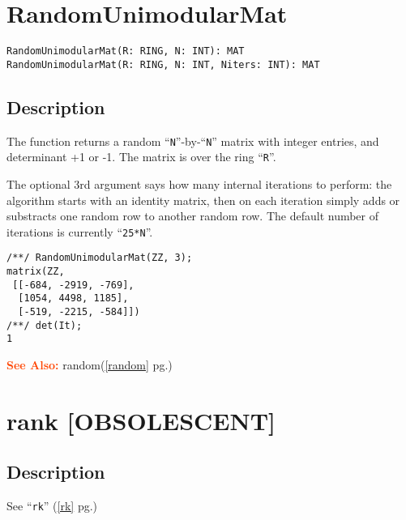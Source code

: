 \documentclass[a4paper]{mybook}
\newenvironment{command}{}{} %
\newcommand\SeeAlso{\par\textcolor{OrangeRed}{\textbf{\large See Also: }}}
\begin{document}
\section{RandomUnimodularMat}
\label{RandomUnimodularMat}
\begin{command} %


\begin{Verbatim}[label=syntax, rulecolor=\color{MidnightBlue},
frame=single]
RandomUnimodularMat(R: RING, N: INT): MAT
RandomUnimodularMat(R: RING, N: INT, Niters: INT): MAT
\end{Verbatim}


\subsection*{Description}

The function returns a random ``\verb&N&''-by-``\verb&N&'' matrix with integer
entries, and determinant +1 or -1.  The matrix is over the ring ``\verb&R&''.
\par 
The optional 3rd argument says how many internal iterations to
perform: the algorithm starts with an identity matrix, then on each
iteration simply adds or substracts one random row to another random
row.  The default number of iterations is currently ``\verb&25*N&''.
\begin{Verbatim}[label=example, rulecolor=\color{PineGreen}, frame=single]
/**/ RandomUnimodularMat(ZZ, 3);
matrix(ZZ,
 [[-684, -2919, -769],
  [1054, 4498, 1185],
  [-519, -2215, -584]])
/**/ det(It);
1
\end{Verbatim}


\SeeAlso %
  random(\ref{random} pg.\pageref{random})
\end{command} %

\section{rank [OBSOLESCENT]}
\label{rank [OBSOLESCENT]}
\begin{command} %



\subsection*{Description}

See ``\verb&rk&'' (\ref{rk} pg.\pageref{rk})

\end{command} %
\end{document}

